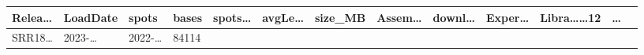 \documentclass[
]{article}
\begin{document}
\begin{longtable}[]{@{}lllllllllllll@{}}
\begin{minipage}[b]{0.05\columnwidth}
Relea\ldots{}\strut
\end{minipage} & \begin{minipage}[b]{0.05\columnwidth}\raggedright
LoadDate\strut
\end{minipage} & \begin{minipage}[b]{0.04\columnwidth}\raggedright
spots\strut
\end{minipage} & \begin{minipage}[b]{0.05\columnwidth}\raggedright
bases\strut
\end{minipage} & \begin{minipage}[b]{0.05\columnwidth}\raggedright
spots\ldots{}\strut
\end{minipage} & \begin{minipage}[b]{0.05\columnwidth}\raggedright
avgLe\ldots{}\strut
\end{minipage} & \begin{minipage}[b]{0.05\columnwidth}\raggedright
size\_MB\strut
\end{minipage} & \begin{minipage}[b]{0.05\columnwidth}\raggedright
Assem\ldots{}\strut
\end{minipage} & \begin{minipage}[b]{0.05\columnwidth}\raggedright
downl\ldots{}\strut
\end{minipage} & \begin{minipage}[b]{0.05\columnwidth}\raggedright
Exper\ldots{}\strut
\end{minipage} & \begin{minipage}[b]{0.08\columnwidth}\raggedright
Libra\ldots\ldots12\strut
\end{minipage} & \begin{minipage}[b]{0.02\columnwidth}\raggedright
\ldots{}\strut
\end{minipage}\tabularnewline
\midrule
\endhead
\begin{minipage}[t]{0.05\columnwidth}\raggedright
SRR18\ldots{}\strut
\end{minipage} & \begin{minipage}[t]{0.05\columnwidth}\raggedright
2023-\ldots{}\strut
\end{minipage} & \begin{minipage}[t]{0.05\columnwidth}\raggedright
2022-\ldots{}\strut
\end{minipage} & \begin{minipage}[t]{0.04\columnwidth}\raggedright
84114\strut
\end{minipage} & \begin{minipage}[t]{0.05\columnwidth}\raggedright

\end{minipage}
\end{longtable}
\end{document}
